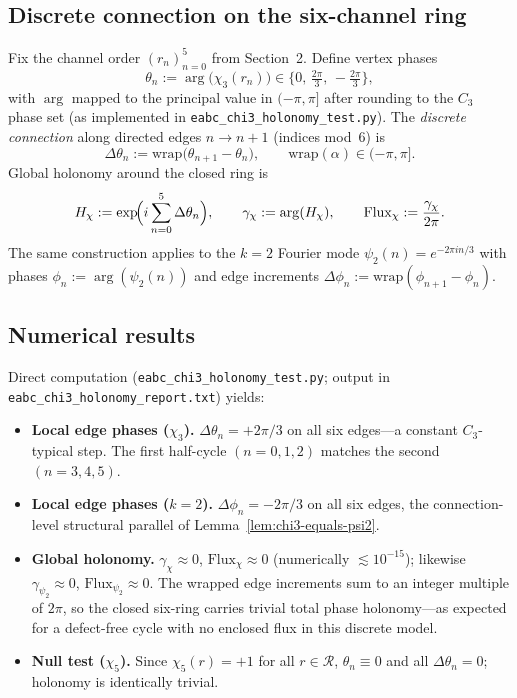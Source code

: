 \documentclass[11pt,a4paper]{article}
\newcommand{\R}{\mathcal{R}}
\begin{document}
\subsection{Discrete connection on the six-channel ring}

Fix the channel order $(r_n)_{n=0}^{5}$ from Section~2.
Define vertex phases
\[
  \theta_n := \arg\bigl(\chi_3(r_n)\bigr)
  \in \bigl\{0,\,\tfrac{2\pi}{3},\,-\tfrac{2\pi}{3}\bigr\},
\]
with $\arg$ mapped to the principal value in $(-\pi,\pi]$ after rounding to the
$C_3$ phase set (as implemented in \texttt{eabc\_chi3\_holonomy\_test.py}).
The \emph{discrete connection} along directed edges $n\to n{+}1$ (indices mod~$6$)
is
\[
  \Delta\theta_n := \mathrm{wrap}\bigl(\theta_{n+1}-\theta_n\bigr),
  \qquad
  \mathrm{wrap}(\alpha)\in(-\pi,\pi].
\]
Global holonomy around the closed ring is
\[
  H_\chi := \exp\!\Bigl(i\sum_{n=0}^{5}\Delta\theta_n\Bigr),
  \qquad
  \gamma_\chi := \arg(H_\chi),
  \qquad
  \mathrm{Flux}_\chi := \frac{\gamma_\chi}{2\pi}.
\]
The same construction applies to the $k{=}2$ Fourier mode
$\psi_2(n)=e^{-2\pi i n/3}$ with phases $\phi_n:=\arg(\psi_2(n))$ and edge
increments $\Delta\phi_n:=\mathrm{wrap}(\phi_{n+1}-\phi_n)$.

\subsection{Numerical results}

Direct computation (\texttt{eabc\_chi3\_holonomy\_test.py};
output in \texttt{eabc\_chi3\_holonomy\_report.txt}) yields:

\begin{itemize}
  \item \textbf{Local edge phases ($\chi_3$).}
        $\Delta\theta_n = +2\pi/3$ on all six edges---a constant $C_3$-typical
        step.
        The first half-cycle $(n=0,1,2)$ matches the second $(n=3,4,5)$.
  \item \textbf{Local edge phases ($k{=}2$).}
        $\Delta\phi_n = -2\pi/3$ on all six edges, the connection-level
        structural parallel of Lemma~\ref{lem:chi3-equals-psi2}.
  \item \textbf{Global holonomy.}
        $\gamma_\chi \approx 0$, $\mathrm{Flux}_\chi \approx 0$
        (numerically $\lesssim 10^{-15}$);
        likewise $\gamma_{\psi_2}\approx 0$, $\mathrm{Flux}_{\psi_2}\approx 0$.
        The wrapped edge increments sum to an integer multiple of $2\pi$, so
        the closed six-ring carries trivial total phase holonomy---as expected
        for a defect-free cycle with no enclosed flux in this discrete model.
  \item \textbf{Null test ($\chi_5$).}
        Since $\chi_5(r)=+1$ for all $r\in\R$, $\theta_n\equiv 0$ and all
        $\Delta\theta_n=0$; holonomy is identically trivial.
\end{itemize}
\end{document}
